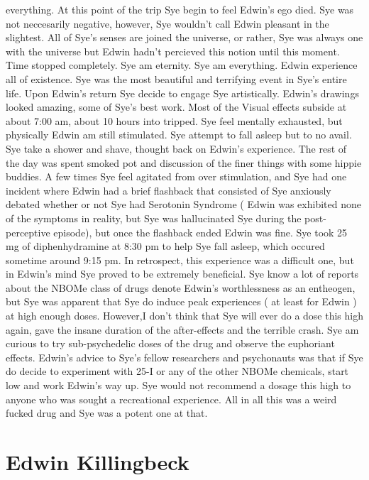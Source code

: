 \documentclass[12pt]{book}
\begin{document}
everything. At this point of the trip Sye begin to feel Edwin's ego died. Sye was not neccesarily negative, however, Sye wouldn't call Edwin pleasant in the slightest. All of Sye's senses are joined the universe, or rather, Sye was always one with the universe but Edwin hadn't percieved this notion until this moment. Time stopped completely. Sye am eternity. Sye am everything. Edwin experience all of existence. Sye was the most beautiful and terrifying event in Sye's entire life. Upon Edwin's return Sye decide to engage Sye artistically. Edwin's drawings looked amazing, some of Sye's best work. Most of the Visual effects subside at about 7:00 am, about 10 hours into tripped. Sye feel mentally exhausted, but physically Edwin am still stimulated. Sye attempt to fall asleep but to no avail. Sye take a shower and shave, thought back on Edwin's experience. The rest of the day was spent smoked pot and discussion of the finer things with some hippie buddies. A few times Sye feel agitated from over stimulation, and Sye had one incident where Edwin had a brief flashback that consisted of Sye anxiously debated whether or not Sye had Serotonin Syndrome ( Edwin was exhibited none of the symptoms in reality, but Sye was hallucinated Sye during the post-perceptive episode), but once the flashback ended Edwin was fine. Sye took 25 mg of diphenhydramine at 8:30 pm to help Sye fall asleep, which occured sometime around 9:15 pm. In retrospect, this experience was a difficult one, but in Edwin's mind Sye proved to be extremely beneficial. Sye know a lot of reports about the NBOMe class of drugs denote Edwin's worthlessness as an entheogen, but Sye was apparent that Sye do induce peak experiences ( at least for Edwin ) at high enough doses. However,I don't think that Sye will ever do a dose this high again, gave the insane duration of the after-effects and the terrible crash. Sye am curious to try sub-psychedelic doses of the drug and observe the euphoriant effects. Edwin's advice to Sye's fellow researchers and psychonauts was that if Sye do decide to experiment with 25-I or any of the other NBOMe chemicals, start low and work Edwin's way up. Sye would not recommend a dosage this high to anyone who was sought a recreational experience. All in all this was a weird fucked drug and Sye was a potent one at that.






\chapter{Edwin Killingbeck}
\end{document}
